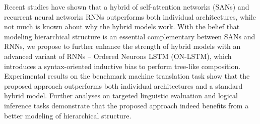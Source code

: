 Recent studies have shown that a hybrid of self-attention networks (SANs) and recurrent neural networks RNNs outperforms both individual architectures, while not much is
known about why the hybrid models work. With the belief that modeling hierarchical
structure is an essential complementary between SANs and RNNs, we propose to further enhance the strength of hybrid models with an advanced variant of RNNs -- Ordered Neurons LSTM (ON-LSTM), which introduces a syntax-oriented inductive bias to perform tree-like composition. Experimental results on the benchmark machine translation task show that the proposed approach outperforms both individual architectures and a standard hybrid model. Further analyses on targeted linguistic evaluation and logical inference tasks demonstrate that the proposed approach indeed benefits from a better modeling of hierarchical structure.